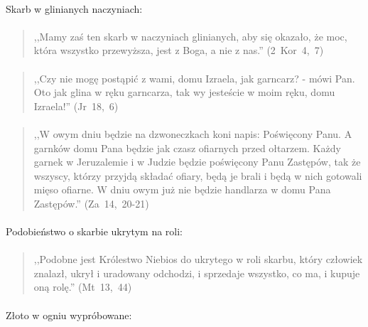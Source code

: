 \documentclass[10pt,a4paper,oneside]{article}
\begin{document}
\paragraph{}
Skarb w glinianych naczyniach:
\paragraph{}
\begin{quote}
,,Mamy zaś ten skarb w naczyniach glinianych, aby się okazało, że moc, która wszystko przewyższa, jest z Boga, a nie z nas.'' \mbox{(2 Kor 4, 7)}
\end{quote}
\paragraph{}
\begin{quote}
,,Czy nie mogę postąpić z wami, domu Izraela, jak garncarz? - mówi Pan. Oto jak glina w ręku garncarza, tak wy jesteście w moim ręku, domu Izraela!'' \mbox{(Jr 18, 6)}
\end{quote}
\paragraph{}
\begin{quote}
,,W owym dniu będzie na dzwoneczkach koni napis: Poświęcony Panu. A garnków domu Pana będzie jak czasz ofiarnych przed ołtarzem. Każdy garnek w Jeruzalemie i w Judzie będzie poświęcony Panu Zastępów, tak że wszyscy, którzy przyjdą składać ofiary, będą je brali i będą w nich gotowali mięso ofiarne. W dniu owym już nie będzie handlarza w domu Pana Zastępów.'' \mbox{(Za 14, 20-21)}
\end{quote}
\paragraph{}
Podobieństwo o skarbie ukrytym na roli:
\paragraph{}
\begin{quote}
,,Podobne jest Królestwo Niebios do ukrytego w roli skarbu, który człowiek znalazł, ukrył i uradowany odchodzi, i sprzedaje wszystko, co ma, i kupuje oną rolę.'' \mbox{(Mt 13, 44)}
\end{quote}
\paragraph{}
Złoto w ogniu wypróbowane:
\end{document}
